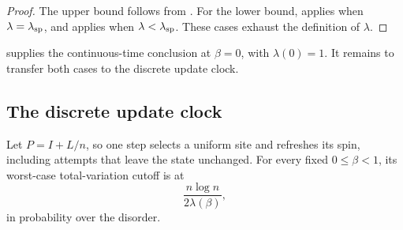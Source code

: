 \begin{proof}
The upper bound follows from .  For the lower
bound,  applies when
$\lambda=\lambda_{\rm sp}$, and  applies
when $\lambda<\lambda_{\rm sp}$.  These cases exhaust the definition
of $\lambda$.
\end{proof}

 supplies the continuous-time conclusion
at $\beta=0$, with $\lambda(0)=1$.  It remains to transfer both cases to
the discrete update clock.

\subsection{The discrete update clock}

\begin{proposition}
\label{prop:cutoff-clock}
Let $P=I+L/n$, so one step selects a uniform site and refreshes its
spin, including attempts that leave the state unchanged.  For every
fixed $0\le\beta<1$, its worst-case total-variation cutoff is at
\[
 \frac{n\log n}{2\lambda(\beta)},
\]
in probability over the disorder.
\end{proposition}

